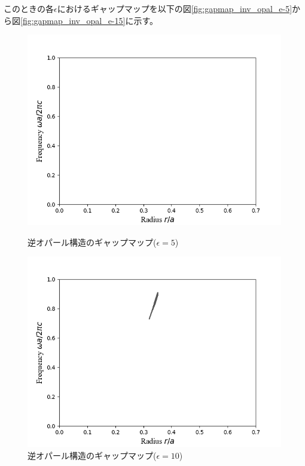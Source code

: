 \documentclass[platex,dvipdfmx]{jsreport}
\numberwithin{equation}{section}
\begin{document}
このときの各$\epsilon$におけるギャップマップを以下の図\ref{fig:gapmap_inv_opal_e-5}から図\ref{fig:gapmap_inv_opal_e-15}に示す。

\begin{figure}[h]
  \begin{minipage}[h]{0.5\linewidth}
    \centering
    \includegraphics[keepaspectratio, scale=0.45]{results/gap_map/inv_e-5.png}
    \caption{逆オパール構造のギャップマップ($\epsilon = 5$)}
    \label{fig:gapmap_inv_opal_e-5}
  \end{minipage}
  \begin{minipage}[h]{0.5\linewidth}
    \centering
    \includegraphics[keepaspectratio, scale=0.45]{results/gap_map/inv_e-10.png}
    \caption{逆オパール構造のギャップマップ($\epsilon = 10$)}
    \label{fig:gapmap_inv_opal_e-10}
  \end{minipage}
\end{figure}
\end{document}
